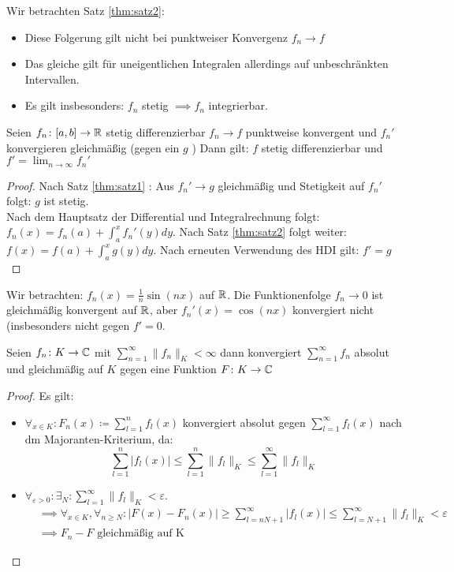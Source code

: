 \begin{remark}
	Wir betrachten Satz \ref{thm:satz2}:
	\begin{itemize}
		\item Diese Folgerung gilt nicht bei punktweiser Konvergenz $f_n \to f$ 
		\item Das gleiche gilt für uneigentlichen Integralen allerdings auf unbeschränkten Intervallen.
		\item Es gilt insbesonders: $f_n$ stetig $\implies f_n$ integrierbar.

	\end{itemize}
\end{remark}
\begin{theorem}
	Seien $f_n \colon [a,b] \to \mathbb{R} $ stetig differenzierbar $f_n \to f$ punktweise konvergent und $f_n'$ konvergieren gleichmäßig (gegen ein $g$ ) Dann gilt: $f$ stetig differenzierbar und $f'= \lim_{n \to \infty} f_n'$ 
\end{theorem}
\begin{proof}
	Nach Satz \ref{thm:satz1} : Aus $f_n' \to g$ gleichmäßig und Stetigkeit auf $f_n'$ folgt: $g$ ist stetig. \\
	Nach dem Hauptsatz der Differential und Integralrechnung folgt: $f_n(x) =f_n(a) + \int_a^x f_n'(y) dy$. Nach Satz \ref{thm:satz2} folgt weiter: $f(x)=f(a) + \int_a^x g(y) dy$. Nach erneuten Verwendung des HDI gilt: $f'=g$   
\end{proof}
\begin{example}
Wir betrachten:
$f_n(x) = \frac{1}{n}\sin(nx)$ auf $\mathbb{R}$. Die Funktionenfolge $f_n \to 0$ ist gleichmäßig konvergent auf $\mathbb{R}$, aber $f_n'(x) = \cos(nx)$ konvergiert nicht (insbesonders nicht gegen $f'=0$.   
\end{example}
\begin{theorem}
	\label{thm:satz4}
	Seien $f_n \colon K \to \mathbb{C} $ mit $\sum_{n=1}^{\infty}\|f_n\|_K < \infty$ dann konvergiert $\sum_{n=1}^{\infty}f_n$ absolut und gleichmäßig auf $K$ gegen eine Funktion $F \colon K \to \mathbb{C} $ 
\end{theorem}
\begin{proof}
Es gilt:
\begin{itemize}
	\item $\forall_{x \in K}: F_n(x) \coloneqq \sum_{l=1}^{n}f_l(x) $ konvergiert absolut gegen $\sum_{l=1}^{\infty}f_l(x)$ nach dm Majoranten-Kriterium, da:
		\[
		\sum_{l=1}^{n}|f_l(x)| \le \sum_{l=1}^{n}\|f_l\|_K \le \sum_{l=1}^{\infty}\|f_l\|_K
		\]
	\item $\forall_{\varepsilon>0}:\exists_{N}: \sum_{l=1}^{\infty}\|f_l\|_K <\varepsilon  $.
		\begin{align*}
		&\implies \forall_{x \in K}, \forall_{n \ge N}: |F(x) -F_n(x)| \ge \sum_{l=nN+1}^{\infty}|f_l(x)| \le \sum_{l=N+1}^{\infty}\|f_l\|_K < \varepsilon \\
		&\implies F_n-F \text{ gleichmäßig auf K}
		\end{align*}
\end{itemize}
\end{proof}
